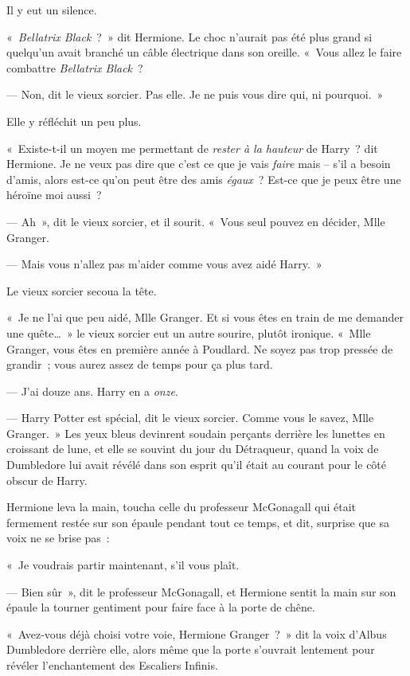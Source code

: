 Il y eut un silence.

«~\emph{Bellatrix Black}~?~»
dit Hermione.
Le choc n'aurait pas été plus grand si quelqu'un avait branché un câble électrique dans son oreille.
«~Vous allez le faire combattre \emph{Bellatrix Black}~?

--- Non, dit le vieux sorcier.
Pas elle.
Je ne puis vous dire qui, ni pourquoi.~»

Elle y réfléchit un peu plus.

«~Existe-t-il un moyen me permettant de \emph{rester à la hauteur} de Harry~? dit Hermione.
Je ne veux pas dire que c'est ce que je vais \emph{faire} mais -- s'il a besoin d'amis, alors est-ce qu'on peut être des amis \emph{égaux}~?
Est-ce que je peux être une héroïne moi aussi~?

--- Ah~», dit le vieux sorcier, et il sourit.
«~Vous seul pouvez en décider, Mlle Granger.

--- Mais vous n'allez pas m'aider comme vous avez aidé Harry.~»

Le vieux sorcier secoua la tête.

«~Je ne l'ai que peu aidé, Mlle Granger.
Et si vous êtes en train de me demander une quête…~»
le vieux sorcier eut un autre sourire, plutôt ironique.
«~Mlle Granger, vous êtes en première année à Poudlard.
Ne soyez pas trop pressée de grandir~; vous aurez assez de temps pour ça plus tard.

--- J'ai douze ans.
Harry en a \emph{onze}.

--- Harry Potter est spécial, dit le vieux sorcier.
Comme vous le savez, Mlle Granger.~»
Les yeux bleus devinrent soudain perçants derrière les lunettes en croissant de lune, et elle se souvint du jour du Détraqueur, quand la voix de Dumbledore lui avait révélé dans son esprit qu'il était au courant pour le côté obscur de Harry.

Hermione leva la main, toucha celle du professeur McGonagall qui était fermement restée sur son épaule pendant tout ce temps, et dit, surprise que sa voix ne se brise pas~:

«~Je voudrais partir maintenant, s'il vous plaît.

--- Bien sûr~», dit le professeur McGonagall, et Hermione sentit la main sur son épaule la tourner gentiment pour faire face à la porte de chêne.

«~Avez-vous déjà choisi votre voie, Hermione Granger~?~»
dit la voix d'Albus Dumbledore derrière elle, alors même que la porte s'ouvrait lentement pour révéler l'enchantement des Escaliers Infinis.

